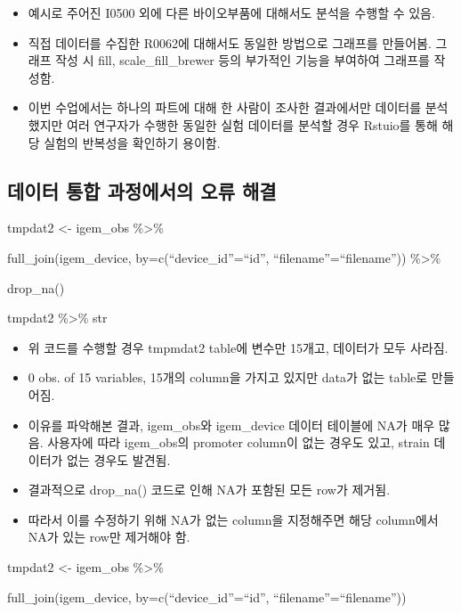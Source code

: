 \documentclass[
]{article}
\begin{document}
\begin{itemize}
\item
  예시로 주어진 I0500 외에 다른 바이오부품에 대해서도 분석을 수행할 수
  있음.
\item
  직접 데이터를 수집한 R0062에 대해서도 동일한 방법으로 그래프를
  만들어봄. 그래프 작성 시 fill, scale\_fill\_brewer 등의 부가적인
  기능을 부여하여 그래프를 작성함.
\item
  이번 수업에서는 하나의 파트에 대해 한 사람이 조사한 결과에서만
  데이터를 분석했지만 여러 연구자가 수행한 동일한 실험 데이터를 분석할
  경우 Rstuio를 통해 해당 실험의 반복성을 확인하기 용이함.
\end{itemize}

\hypertarget{uxb370uxc774uxd130-uxd1b5uxd569-uxacfcuxc815uxc5d0uxc11cuxc758-uxc624uxb958-uxd574uxacb0}{%
\subsection{데이터 통합 과정에서의 오류
해결}\label{uxb370uxc774uxd130-uxd1b5uxd569-uxacfcuxc815uxc5d0uxc11cuxc758-uxc624uxb958-uxd574uxacb0}}

tmpdat2 \textless- igem\_obs \%\textgreater\%

full\_join(igem\_device, by=c(``device\_id''=``id'',
``filename''=``filename'')) \%\textgreater\%

drop\_na()

tmpdat2 \%\textgreater\% str

\begin{itemize}
\item
  위 코드를 수행할 경우 tmpmdat2 table에 변수만 15개고, 데이터가 모두
  사라짐.
\item
  0 obs. of 15 variables, 15개의 column을 가지고 있지만 data가 없는
  table로 만들어짐.
\item
  이유를 파악해본 결과, igem\_obs와 igem\_device 데이터 테이블에 NA가
  매우 많음. 사용자에 따라 igem\_obs의 promoter column이 없는 경우도
  있고, strain 데이터가 없는 경우도 발견됨.
\item
  결과적으로 drop\_na() 코드로 인해 NA가 포함된 모든 row가 제거됨.
\item
  따라서 이를 수정하기 위해 NA가 없는 column을 지정해주면 해당
  column에서 NA가 있는 row만 제거해야 함.
\end{itemize}

tmpdat2 \textless- igem\_obs \%\textgreater\%

full\_join(igem\_device, by=c(``device\_id''=``id'',
``filename''=``filename''))
\end{document}
